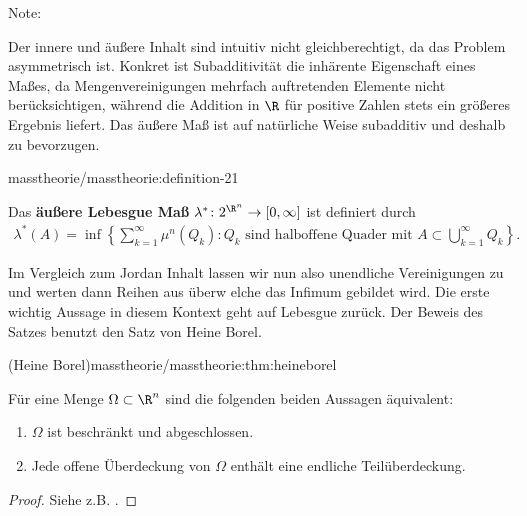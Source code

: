 \documentclass[letterpaper,10pt,english]{jupyterBook}
\begin{document}
\begin{emphBox}{}{}{Note:}
\par
Der innere und äußere Inhalt sind intuitiv nicht gleichberechtigt, da das Problem asymmetrisch ist. Konkret ist Subadditivität die inhärente Eigenschaft eines Maßes, da Mengenvereinigungen mehrfach auftretenden Elemente nicht berücksichtigen, während die Addition in \(\R\) für positive Zahlen stets ein größeres Ergebnis liefert. Das äußere Maß ist auf natürliche Weise subadditiv und deshalb zu bevorzugen.
\end{emphBox}
\begin{definition}{}{masstheorie/masstheorie:definition-21}



\par
Das \textbf{äußere Lebesgue Maß} \(\lambda^* \colon 2^{\R^n} \rightarrow [0,\infty]\) ist definiert durch
\begin{align*}
\lambda^*(A) = \inf \left\{ \sum_{k=1}^\infty \mu^n(Q_k) : Q_k \text{ sind halboffene Quader mit } A \subset \bigcup_{k=1}^\infty Q_k \right\}.
\end{align*}\end{definition}

\par
Im Vergleich zum Jordan Inhalt lassen wir nun also unendliche Vereinigungen zu und werten dann Reihen aus überw elche das Infimum gebildet wird. Die erste wichtig Aussage in diesem Kontext geht auf Lebesgue zurück. Der Beweis des Satzes benutzt den Satz von Heine Borel.
\begin{theorem}{(Heine Borel)}{masstheorie/masstheorie:thm:heineborel}



\par
Für eine Menge \(\Omega\subset\R^n\) sind die folgenden beiden Aussagen äquivalent:
\begin{enumerate}

\item {} 
\par
\(\Omega\) ist beschränkt und abgeschlossen.

\item {} 
\par
Jede offene Überdeckung von \(\Omega\) enthält eine endliche Teilüberdeckung.

\end{enumerate}
\end{theorem}

\begin{proof}
 Siehe z.B. \cite{For17}.
\end{proof}
\end{document}
